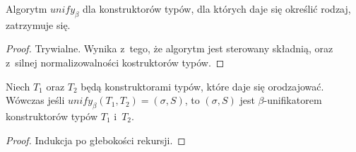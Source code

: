 \documentclass[11pt,leqno]{article}
\begin{document}
\begin{fakt}
Algorytm $unify_\beta$ dla konstruktorów typów, dla których daje się określić rodzaj, zatrzymuje się.
\end{fakt}
\begin{proof}
Trywialne. Wynika z~tego, że algorytm jest sterowany składnią, oraz z~silnej normalizowalności kostruktorów typów.
\end{proof}
\begin{twierdzenie}
Niech $T_1$ oraz $T_2$ będą konstruktorami typów, które daje się orodzajować. Wówczas jeśli
$unify_\beta(T_1, T_2) = (\sigma, S)$, to $(\sigma, S)$ jest $\beta$-unifikatorem konstruktorów typów
$T_1$ i~$T_2$.
\end{twierdzenie}
\begin{proof}
Indukcja po głebokości rekursji.


\end{proof}
\end{document}
